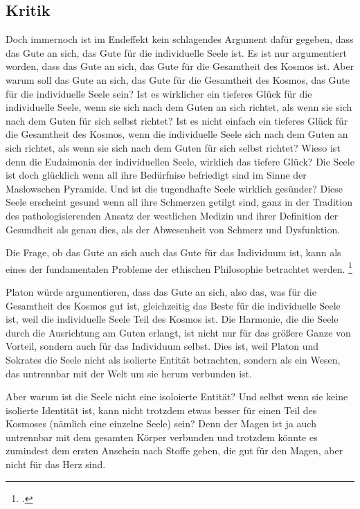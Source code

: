 \documentclass[12pt,a4paper]{article}
\begin{document}
\subsection[short]{Kritik}
Doch immernoch ist im Endeffekt kein schlagendes Argument dafür gegeben, dass das Gute an sich, das Gute für die individuelle Seele ist. Es ist nur argumentiert worden, dass das Gute an sich, das Gute für die Gesamtheit des Kosmos ist. Aber warum soll das Gute an sich, das Gute für die Gesamtheit des Kosmos, das Gute für die individuelle Seele sein? Ist es wirklicher ein tieferes Glück für die individuelle Seele, wenn sie sich nach dem Guten an sich richtet, als wenn sie sich nach dem Guten für sich selbst richtet? Ist es nicht einfach ein tieferes Glück für die Gesamtheit des Kosmos, wenn die individuelle Seele sich nach dem Guten an sich richtet, als wenn sie sich nach dem Guten für sich selbst richtet? Wieso ist denn die Eudaimonia der individuellen Seele, wirklich das tiefere Glück? Die Seele ist doch glücklich wenn all ihre Bedürfnise befriedigt sind im Sinne der Maslowschen Pyramide. Und ist die tugendhafte Seele wirklich gesünder? Diese Seele erscheint gesund wenn all ihre Schmerzen getilgt sind, ganz in der Tradition des pathologisierenden Ansatz der westlichen Medizin und ihrer Definition der Gesundheit als genau dies, als der Abwesenheit von Schmerz und Dysfunktion.

Die Frage, ob das Gute an sich auch das Gute für das Individuum ist, kann als eines der fundamentalen Probleme der ethischen Philosophie betrachtet werden. \footcite{maslow1987}

Platon würde argumentieren, dass das Gute an sich, also das, was für die Gesamtheit des Kosmos gut ist, gleichzeitig das Beste für die individuelle Seele ist, weil die individuelle Seele Teil des Kosmos ist. Die Harmonie, die die Seele durch die Ausrichtung am Guten erlangt, ist nicht nur für das größere Ganze von Vorteil, sondern auch für das Individuum selbst. Dies ist, weil Platon und Sokrates die Seele nicht als isolierte Entität betrachten, sondern als ein Wesen, das untrennbar mit der Welt um sie herum verbunden ist. 

Aber warum ist die Seele nicht eine isoloierte Entität? Und selbst wenn sie keine isolierte Identität ist, kann nicht trotzdem etwas besser für einen Teil des Kosmoses (nämlich eine einzelne Seele) sein? Denn der Magen ist ja auch untrennbar mit dem gesamten Körper verbunden und trotzdem könnte es zumindest dem ersten Anschein nach Stoffe geben, die gut für den Magen, aber nicht für das Herz sind.
\end{document}
